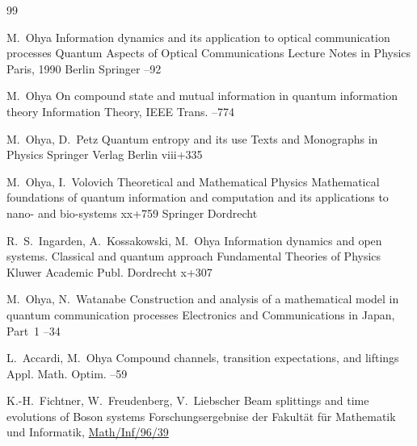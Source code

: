 \def\refname{REFERENCES}
\begin{thebibliography}{99}



\by M.~Ohya
\paper Information dynamics and its application to optical communication processes
\inbook Quantum Aspects of Optical Communications
\serial Lecture Notes in Physics 
\procinfo Paris, 1990
\publaddr Berlin
\publ Springer
--92 



\by M.~Ohya
\paper On compound state and mutual information in quantum information theory
\jour Information Theory, IEEE Trans. 
--774



\by M.~Ohya, D.~Petz
\book  Quantum entropy and its use
\serial Texts and Monographs in Physics
\publaddr Springer Verlag
\publ Berlin
\totalpages viii+335


\by M.~Ohya, I.~Volovich
\serial Theoretical and Mathematical Physics
\book Mathematical foundations of quantum information and computation and its applications to nano- and bio-systems
\totalpages xx+759
\publ Springer 
\publaddr Dordrecht


\by R.~S.~Ingarden, A.~Kossakowski, M.~Ohya
\book Information dynamics and open systems. Classical and quantum approach
\serial Fundamental Theories of Physics
\publ Kluwer Academic Publ.
\publaddr Dordrecht
\totalpages x+307



\by M.~Ohya, N.~Watanabe
\paper  Construction and analysis of a mathematical model in quantum communication processes
\jour Electronics and Communications in Japan, Part~1
--34 

\by L.~Accardi, M.~Ohya
\paper Compound channels, transition expectations, and liftings
\jour Appl. Math. Optim.
--59 


\by K.-H.~Fichtner, W.~Freudenberg, V.~Liebscher
\preprint Beam splittings and time evolutions of Boson systems
\preprintinfo  Forschungsergebnise der Fakult\"at f\"ur Mathematik und Informatik, 
\href{http://www.math-inf.uni-greifswald.de/biomathematik/liebscher/publications/ffl.ps}{Math/Inf/96/39}



\end{thebibliography}
